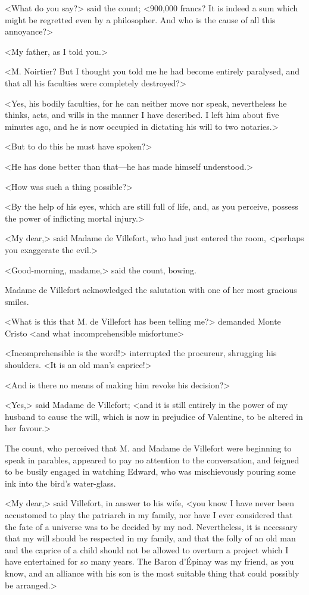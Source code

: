 <What do you say?> said the count; <900,000 francs? It is indeed a sum which might be regretted even by a philosopher. And who is the cause of all this annoyance?> 

 <My father, as I told you.> 

 <M. Noirtier? But I thought you told me he had become entirely paralysed, and that all his faculties were completely destroyed?> 

 <Yes, his bodily faculties, for he can neither move nor speak, nevertheless he thinks, acts, and wills in the manner I have described. I left him about five minutes ago, and he is now occupied in dictating his will to two notaries.> 

 <But to do this he must have spoken?> 

 <He has done better than that—he has made himself understood.> 

 <How was such a thing possible?> 

 <By the help of his eyes, which are still full of life, and, as you perceive, possess the power of inflicting mortal injury.> 

 <My dear,> said Madame de Villefort, who had just entered the room, <perhaps you exaggerate the evil.> 

 <Good-morning, madame,> said the count, bowing. 

 

 Madame de Villefort acknowledged the salutation with one of her most gracious smiles. 

 <What is this that M. de Villefort has been telling me?> demanded Monte Cristo <and what incomprehensible misfortune\longdash> 

 <Incomprehensible is the word!> interrupted the procureur, shrugging his shoulders. <It is an old man's caprice!> 

 <And is there no means of making him revoke his decision?> 

 <Yes,> said Madame de Villefort; <and it is still entirely in the power of my husband to cause the will, which is now in prejudice of Valentine, to be altered in her favour.> 

 The count, who perceived that M. and Madame de Villefort were beginning to speak in parables, appeared to pay no attention to the conversation, and feigned to be busily engaged in watching Edward, who was mischievously pouring some ink into the bird's water-glass. 

 <My dear,> said Villefort, in answer to his wife, <you know I have never been accustomed to play the patriarch in my family, nor have I ever considered that the fate of a universe was to be decided by my nod. Nevertheless, it is necessary that my will should be respected in my family, and that the folly of an old man and the caprice of a child should not be allowed to overturn a project which I have entertained for so many years. The Baron d'Épinay was my friend, as you know, and an alliance with his son is the most suitable thing that could possibly be arranged.> 


